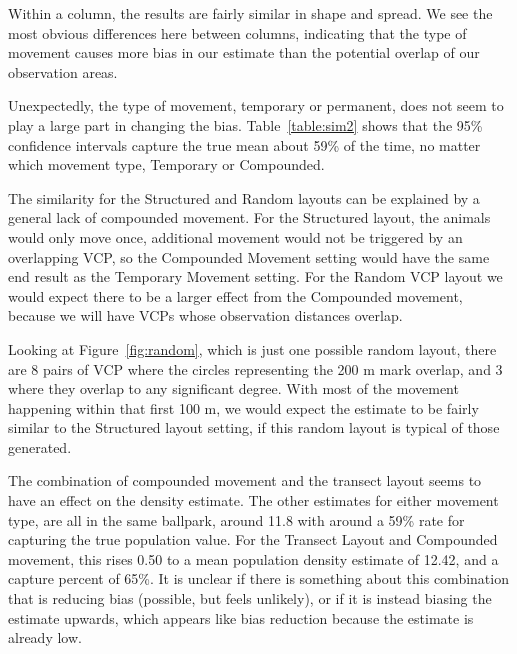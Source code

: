 \documentclass[12pt]{article}
\begin{document}
Within a column, the results are fairly similar in shape and spread. We see the most obvious differences here between columns, indicating that the type of movement causes more bias in our estimate than the potential overlap of our observation areas. 

Unexpectedly, the type of movement, temporary or permanent, does not seem to play a large part in changing the bias. Table~\ref{table:sim2} shows that the 95\% confidence intervals \parencite{quang1993} capture the true mean about 59\% of the time, no matter which movement type, Temporary or Compounded.

The similarity for the Structured and Random layouts can be explained by a general lack of compounded movement. For the Structured layout, the animals would only move once, additional movement would not be triggered by an overlapping VCP, so the Compounded Movement setting would have the same end result as the Temporary Movement setting. For the Random VCP layout we would expect there to be a larger effect from the Compounded movement, because we will have VCPs whose observation distances overlap. 

Looking at Figure~\ref{fig:random}, which is just one possible random layout, there are 8 pairs of VCP where the circles representing the 200 m mark overlap, and 3 where they overlap to any significant degree. With most of the movement happening within that first 100 m, we would expect the estimate to be fairly similar to the Structured layout setting, if this random layout is typical of those generated. 

The combination of compounded movement and the transect layout seems to have an effect on the density estimate. The other estimates for either movement type, are all in the same ballpark, around 11.8 with around a 59\% rate for capturing the true population value. For the Transect Layout and Compounded movement, this rises 0.50 to a mean population density estimate of 12.42, and a capture percent of 65\%. It is unclear if there is something about this combination that is reducing bias (possible, but feels unlikely), or if it is instead biasing the estimate upwards, which appears like bias reduction because the estimate is already low.


\end{document}
